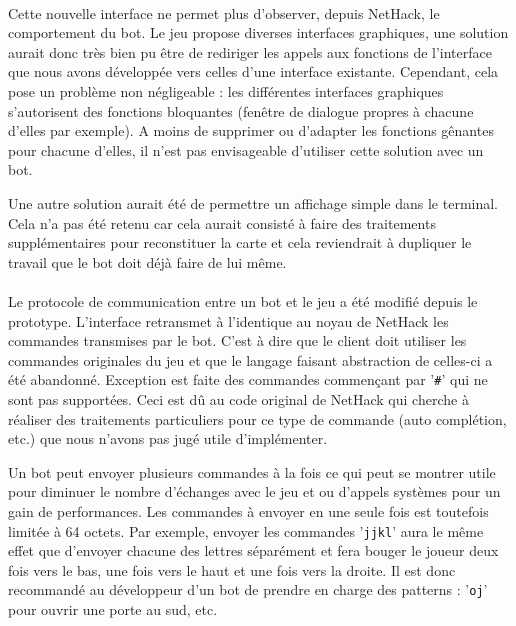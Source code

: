 \documentclass[a4paper,12pt]{article}
\begin{document}
\paragraph{} Cette nouvelle interface ne permet plus d'observer, depuis
NetHack, le comportement du bot. Le jeu propose diverses interfaces
graphiques, une solution aurait donc très bien pu être de rediriger les appels
aux fonctions de l'interface que nous avons développée vers celles d'une
interface existante. Cependant, cela pose un problème non négligeable : les
différentes interfaces graphiques s'autorisent des fonctions bloquantes
(fenêtre de dialogue propres à chacune d'elles par exemple). A moins de
supprimer ou d'adapter les fonctions gênantes pour chacune d'elles, il n'est
pas envisageable d'utiliser cette solution avec un bot.

Une autre solution aurait été de permettre un affichage simple dans le
terminal. Cela n'a pas été retenu car cela aurait consisté à faire des
traitements supplémentaires pour reconstituer la carte et cela reviendrait à
dupliquer le travail que le bot doit déjà faire de lui même.

\paragraph{} Le protocole de communication entre un bot et le jeu a été
modifié depuis le prototype. L'interface retransmet à l'identique au noyau de
NetHack les commandes transmises par le bot. C'est à dire que le client doit
utiliser les commandes originales du jeu et que le langage faisant abstraction
de celles-ci a été abandonné. Exception est faite des commandes commençant par
'\verb!#!' qui ne sont pas supportées. Ceci est dû au code original de NetHack
qui cherche à réaliser des traitements particuliers pour ce type de commande
(auto complétion, etc.) que nous n'avons pas jugé utile d'implémenter.

Un bot peut envoyer plusieurs commandes à la fois ce qui peut se montrer utile
pour diminuer le nombre d'échanges avec le jeu et ou d'appels systèmes pour un
gain de performances. Les commandes à envoyer en une seule fois est toutefois
limitée à 64 octets. Par exemple, envoyer les commandes '\verb!jjkl!' aura le
même effet que d'envoyer chacune des lettres séparément et fera bouger le
joueur deux fois vers le bas, une fois vers le haut et une fois vers la
droite. Il est donc recommandé au développeur d'un bot de prendre en charge
des patterns : '\verb!oj!' pour ouvrir une porte au sud, etc.
\end{document}
